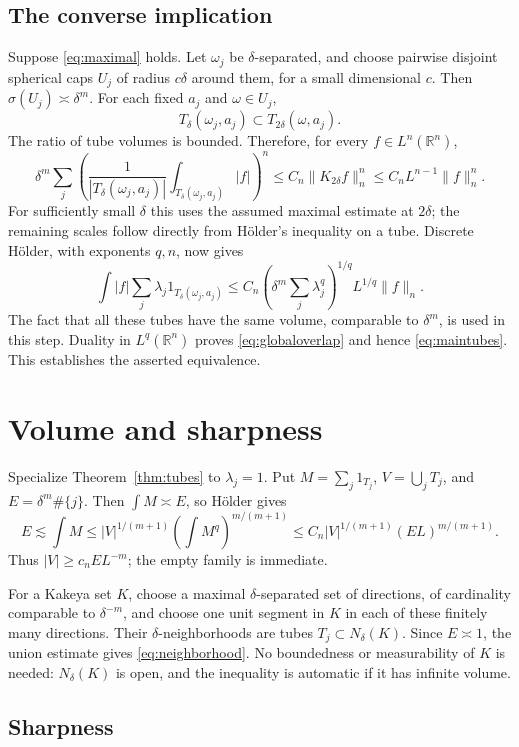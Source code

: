 \documentclass[11pt]{article}
\numberwithin{equation}{section}
\newcommand{\R}{\mathbb R}
\begin{document}
\subsection*{The converse implication}

Suppose \eqref{eq:maximal} holds. Let $\omega_j$ be
$\delta$-separated, and choose pairwise disjoint spherical caps
$U_j$ of radius $c\delta$ around them, for a small dimensional $c$.
Then $\sigma(U_j)\asymp\delta^m$.
For each fixed $a_j$ and $\omega\in U_j$,
\[
 T_\delta(\omega_j,a_j)\subset T_{2\delta}(\omega,a_j).
\]
The ratio of tube volumes is bounded. Therefore, for every
$f\in L^n(\R^n)$,
\[
 \delta^m\sum_j\left(
       \frac1{|T_\delta(\omega_j,a_j)|}
           \int_{T_\delta(\omega_j,a_j)}|f|\right)^n
 \le C_n\|K_{2\delta}f\|_n^n
 \le C_nL^{n-1}\|f\|_n^n.
\]
For sufficiently small $\delta$ this uses the assumed maximal
estimate at $2\delta$; the remaining scales follow directly from
H\"older's inequality on a tube.
Discrete H\"older, with exponents $q,n$, now gives
\[
 \int |f|\sum_j\lambda_j1_{T_\delta(\omega_j,a_j)}
 \le C_n
 \left(\delta^m\sum_j\lambda_j^q\right)^{1/q}
       L^{1/q}\|f\|_n.
\]
The fact that all these tubes have the same volume, comparable to
$\delta^m$, is used in this step.
Duality in $L^q(\R^n)$ proves \eqref{eq:globaloverlap} and hence
\eqref{eq:maintubes}. This establishes the asserted equivalence.

\section{Volume and sharpness}

Specialize Theorem~\ref{thm:tubes} to $\lambda_j=1$.
Put $M=\sum_j1_{T_j}$, $V=\bigcup_jT_j$, and
$E=\delta^m\#\{j\}$. Then $\int M\asymp E$, so H\"older gives
\[
 E\lesssim\int M
 \le |V|^{1/(m+1)}\left(\int M^q\right)^{m/(m+1)}
 \le C_n|V|^{1/(m+1)}(EL)^{m/(m+1)}.
\]
Thus $|V|\ge c_nEL^{-m}$; the empty family is immediate.

For a Kakeya set $K$, choose a maximal $\delta$-separated set of
directions, of cardinality comparable to $\delta^{-m}$, and choose
one unit segment in $K$ in each of these finitely many directions.
Their $\delta$-neighborhoods are tubes $T_j\subset N_\delta(K)$.
Since $E\asymp1$, the union estimate gives
\eqref{eq:neighborhood}. No boundedness or measurability of $K$
is needed: $N_\delta(K)$ is open, and the inequality is automatic
if it has infinite volume.

\subsection*{Sharpness}
\end{document}
